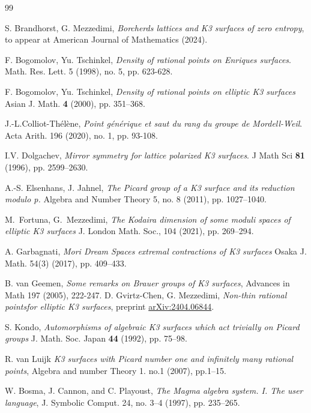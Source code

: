 \documentclass{amsart}
\theoremstyle{definition}
\numberwithin{equation}{section}
\begin{document}
\begin{thebibliography}{99}

 S. Brandhorst, G. Mezzedimi, \textit{Borcherds lattices and K3 surfaces of zero entropy}, to appear at American Journal of Mathematics (2024).


 F. Bogomolov, Yu. Tschinkel, \textit{Density of rational points on Enriques surfaces}. Math. Res. Lett. 5 (1998), no. 5, pp. 623-628.


 F. Bogomolov, Yu. Tschinkel,  \textit{Density of rational points on elliptic  K3  surfaces}
Asian J. Math. {\bf 4} (2000), pp. 351--368.

 J.-L.Colliot-Th\'el\`ene, \textit{Point g\'en\'erique et saut du rang du groupe de Mordell-Weil}.  Acta Arith. 196 (2020), no. 1, pp. 93-108. 

 I.V. Dolgachev, \textit{Mirror symmetry for lattice polarized K3 surfaces}. J Math Sci {\bf 81} (1996), pp. 2599--2630.

 A.-S. Elsenhans, J. Jahnel, \textit{The Picard group of a K3 surface and its reduction modulo p.} Algebra and Number Theory 5, no. 8 (2011), pp. 1027--1040.

 M.\ Fortuna, G.\ Mezzedimi, \textit{The Kodaira dimension of some moduli spaces of elliptic K3 surfaces} J. London Math. Soc., 104 (2021),  pp. 269--294.

 A. Garbagnati, \textit{Mori Dream Spaces extremal contractions of K3 surfaces} Osaka J. Math. 54(3) (2017), pp. 409--433.

 B. van Geemen, \textit{Some remarks on Brauer groups of K3 surfaces}, Advances in Math 197 (2005), 222-247.
 D. Gvirtz-Chen, G. Mezzedimi, \textit{Non-thin rational pointsfor elliptic K3 surfaces}, preprint \href{https://arxiv.org/abs/2404.06844}{arXiv:2404.06844}.

 S. Kondo, {\it Automorphisms of algebraic K3 surfaces which act trivially on Picard groups} J. Math. Soc. Japan {\bf 44} (1992), pp. 75--98. 

 R. van Luijk \textit{K3 surfaces with Picard number one and infinitely many rational points}, Algebra and number Theory 1. no.1 (2007), pp.1--15.

 W. Bosma, J. Cannon, and C. Playoust, \textit{The {M}agma algebra system. {I}. {T}he user language}, J. Symbolic Comput. 24, no. 3--4 (1997), pp. 235--265.


\end{thebibliography}
\end{document}

